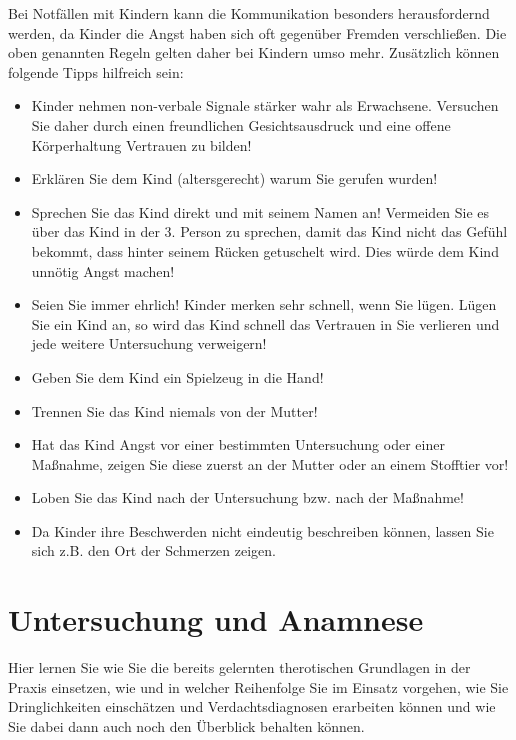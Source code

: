 Bei Notfällen mit Kindern kann die Kommunikation besonders herausfordernd werden, da Kinder die Angst haben sich oft gegenüber Fremden verschließen. Die oben genannten Regeln gelten daher bei Kindern umso mehr. Zusätzlich können folgende Tipps hilfreich sein:
\begin{itemize}
\item Kinder nehmen non-verbale Signale stärker wahr als Erwachsene. Versuchen Sie daher durch einen freundlichen Gesichtsausdruck und eine offene Körperhaltung Vertrauen zu bilden!
\item Erklären Sie dem Kind (altersgerecht) warum Sie gerufen wurden!
\item Sprechen Sie das Kind direkt und mit seinem Namen an! Vermeiden Sie es über das Kind in der 3. Person zu sprechen, damit das Kind nicht das Gefühl bekommt, dass hinter seinem Rücken getuschelt wird. Dies würde dem Kind unnötig Angst machen!
\item Seien Sie immer ehrlich! Kinder merken sehr schnell, wenn Sie lügen. Lügen Sie ein Kind an, so wird das Kind schnell das Vertrauen in Sie verlieren und jede weitere Untersuchung verweigern!
\item Geben Sie dem Kind ein Spielzeug in die Hand!
\item Trennen Sie das Kind niemals von der Mutter!
\item Hat das Kind Angst vor einer bestimmten Untersuchung oder einer Maßnahme, zeigen Sie diese zuerst an der Mutter oder an einem Stofftier vor!
\item Loben Sie das Kind nach der Untersuchung bzw. nach der Maßnahme!
\item Da Kinder ihre Beschwerden nicht eindeutig beschreiben können, lassen Sie sich z.B. den Ort der Schmerzen zeigen.
\end{itemize}



\section{Untersuchung und Anamnese}

Hier lernen Sie wie Sie die bereits gelernten therotischen Grundlagen in
der Praxis einsetzen, wie und in welcher Reihenfolge Sie im Einsatz
vorgehen, wie Sie Dringlichkeiten einsch\"atzen und Verdachtsdiagnosen
erarbeiten k\"onnen und wie Sie dabei dann auch noch den \"Uberblick
behalten k\"onnen.

